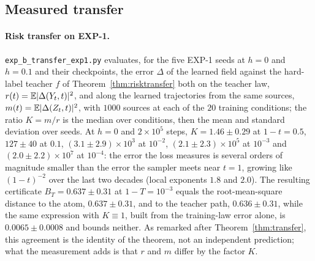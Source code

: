 \documentclass{article} %
\theoremstyle{plain}
\theoremstyle{definition}
\theoremstyle{remark}
\begin{document}
\subsection{Measured transfer}
\label{app:measured-transfer}

\paragraph{Risk transfer on EXP-1.} \texttt{exp\_b\_transfer\_exp1.py} evaluates, for the five
EXP-1 seeds at $h=0$ and $h=0.1$ and their checkpoints, the error $\Delta$ of the learned field
against the hard-label teacher $f$ of Theorem~\ref{thm:risktransfer} both on the teacher law,
$r(t)=\mathbb{E}|\Delta(Y_t,t)|^2$, and along the learned trajectories from the same sources,
$m(t)=\mathbb{E}|\Delta(Z_t,t)|^2$, with $1000$ sources at each of the $20$ training conditions; the
ratio $K=m/r$ is the median over conditions, then the mean and standard deviation over seeds. At
$h=0$ and $2\times10^5$ steps, $K=1.46\pm0.29$ at $1-t=0.5$, $127\pm40$ at $0.1$,
$(3.1\pm2.9)\times10^3$ at $10^{-2}$, $(2.1\pm2.3)\times10^5$ at $10^{-3}$ and
$(2.0\pm2.2)\times10^7$ at $10^{-4}$: the error the loss measures is several orders of magnitude
smaller than the error the sampler meets near $t=1$, growing like $(1-t)^{-2}$ over the last two decades
(local exponents $1.8$ and $2.0$). The
resulting certificate $B_T=0.637\pm0.31$ at $1-T=10^{-3}$ equals the root-mean-square distance
to the atom, $0.637\pm0.31$, and to the teacher path, $0.636\pm0.31$, while the same expression
with $K\equiv1$, built from the training-law error alone, is $0.0065\pm0.0008$ and bounds neither. As remarked after
Theorem~\ref{thm:transfer}, this agreement is the identity of the theorem, not an independent
prediction; what the measurement adds is that $r$ and $m$ differ by the factor $K$.
\end{document}
